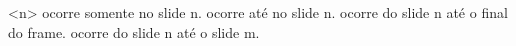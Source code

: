\comando<n> ocorre somente no slide n.
 ocorre até no slide n.
 ocorre do slide n até o final do frame.
 ocorre do slide n até o slide m.
